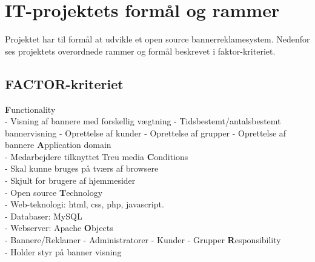 \documentclass[a4paper,12pt]{article}
\begin{document}
\section{IT-projektets formål og rammer}

Projektet har til formål at udvikle et open source bannerreklamesystem. Nedenfor ses projektets overordnede rammer og formål beskrevet i faktor-kriteriet. 

\subsection{FACTOR-kriteriet}

\large{\bf{F}}\normalsize{unctionality
\\
- Visning af bannere med forskellig vægtning
\newline
- Tidsbestemt/antalsbestemt bannervisning 
\newline
- Oprettelse af kunder 
\newline
- Oprettelse af grupper
\newline
- Oprettelse af bannere}
\newline
\newline
\large{\bf{A}}\normalsize{pplication domain
\\
- Medarbejdere tilknyttet Treu media}
\newline
\newline
\large{\bf{C}}\normalsize{onditions\\
- Skal kunne bruges på tværs af browsere\\
- Skjult for brugere af hjemmesider\\
- Open source}
\newline
\newline
\large{\bf{T}}\normalsize{echnology\\
- Web-teknologi: html, css, php, javascript.\\
- Databaser: MySQL\\
- Webserver: Apache}
\newline
\newline
\large{\bf{O}}\normalsize{bjects\\
- Bannere/Reklamer
\newline
- Administratorer
\newline
- Kunder
\newline
- Grupper}
\newline
\newline
\large{\bf{R}}\normalsize{esponsibility\\
- Holder styr på banner visning}
\end{document}
